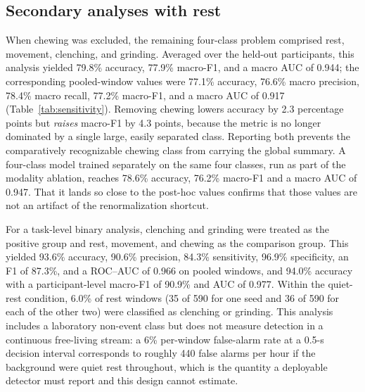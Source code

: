 \documentclass[pdflatex,sn-nature,iicol]{sn-jnl}
\begin{document}
\subsection{Secondary analyses with rest}

When chewing was excluded, the remaining four-class problem comprised rest, movement, clenching, and grinding. Averaged over the held-out participants, this analysis yielded 79.8\% accuracy, 77.9\% macro-F1, and a macro AUC of 0.944; the corresponding pooled-window values were 77.1\% accuracy, 76.6\% macro precision, 78.4\% macro recall, 77.2\% macro-F1, and a macro AUC of 0.917 (Table~\ref{tab:sensitivity}). Removing chewing lowers accuracy by 2.3 percentage points but \emph{raises} macro-F1 by 4.3 points, because the metric is no longer dominated by a single large, easily separated class. Reporting both prevents the comparatively recognizable chewing class from carrying the global summary. A four-class model trained separately on the same four classes, run as part of the modality ablation, reaches 78.6\% accuracy, 76.2\% macro-F1 and a macro AUC of 0.947. That it lands so close to the post-hoc values confirms that those values are not an artifact of the renormalization shortcut.

For a task-level binary analysis, clenching and grinding were treated as the positive group and rest, movement, and chewing as the comparison group. This yielded 93.6\% accuracy, 90.6\% precision, 84.3\% sensitivity, 96.9\% specificity, an F1 of 87.3\%, and a ROC--AUC of 0.966 on pooled windows, and 94.0\% accuracy with a participant-level macro-F1 of 90.9\% and AUC of 0.977. Within the quiet-rest condition, 6.0\% of rest windows (35 of 590 for one seed and 36 of 590 for each of the other two) were classified as clenching or grinding. This analysis includes a laboratory non-event class but does not measure detection in a continuous free-living stream: a 6\% per-window false-alarm rate at a 0.5-s decision interval corresponds to roughly 440 false alarms per hour if the background were quiet rest throughout, which is the quantity a deployable detector must report and this design cannot estimate.
\end{document}
